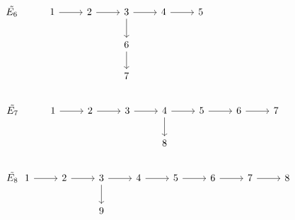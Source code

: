 $\begin{tikzcd}
\tilde{E_6}& 1\arrow[r] & 2\arrow[r] & 3\arrow[r]\arrow[d] & 4\arrow[r] & 5\\
&		&		&  6\arrow[d] & 			& \\
&		&		&  7 & 			& \\
\end{tikzcd}$\\
$\begin{tikzcd}
\tilde{E_7}& 1\arrow[r] & 2\arrow[r] & 3\arrow[r]& 4\arrow[r]\arrow[d]  & 5\arrow[r] & 6\arrow[r] & 7\\
&		&		   &  		     & 	8		      & 		& 		&\\
\end{tikzcd}$\\
$\begin{tikzcd}
\tilde{E_8}\,\,\,\, 1\arrow[r] & 2\arrow[r] & 3\arrow[r]\arrow[d] & 4\arrow[r] & 5\arrow[r] & 6\arrow[r] & 7\arrow[r] & 8\\
	&		&  			9& 			& & & &\\
\end{tikzcd}$
